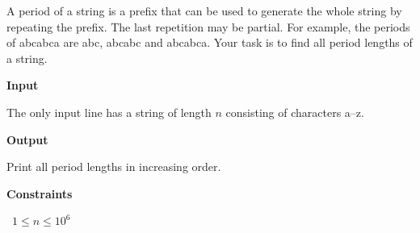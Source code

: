 A period of a string is a prefix that can be used to generate the whole string by repeating the prefix. The last repetition may be partial. For example, the periods of abcabca are abc, abcabc and abcabca.
Your task is to find all period lengths of a string.

\vspace{0.3cm}\noindent\textbf{Input}

The only input line has a string of length $n$ consisting of characters a–z.

\vspace{0.3cm}\noindent\textbf{Output}

Print all period lengths in increasing order.

\vspace{0.3cm}\noindent\textbf{Constraints}

\textbullet\ $1 \le n \le 10^6$